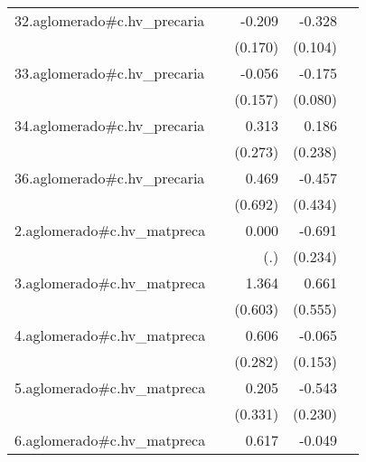 {\begin{longtable}{l*{4}{D{.}{.}{-1}}}
\addlinespace
32.aglomerado#c.hv\_precaria&                     &      -0.209         &      -0.328\sym{**} &                     \\
            &                     &     (0.170)         &     (0.104)         &                     \\
\addlinespace
33.aglomerado#c.hv\_precaria&                     &      -0.056         &      -0.175\sym{*}  &                     \\
            &                     &     (0.157)         &     (0.080)         &                     \\
\addlinespace
34.aglomerado#c.hv\_precaria&                     &       0.313         &       0.186         &                     \\
            &                     &     (0.273)         &     (0.238)         &                     \\
\addlinespace
36.aglomerado#c.hv\_precaria&                     &       0.469         &      -0.457         &                     \\
            &                     &     (0.692)         &     (0.434)         &                     \\
\addlinespace
2.aglomerado#c.hv\_matpreca&                     &       0.000         &      -0.691\sym{**} &                     \\
            &                     &         (.)         &     (0.234)         &                     \\
\addlinespace
3.aglomerado#c.hv\_matpreca&                     &       1.364\sym{*}  &       0.661         &                     \\
            &                     &     (0.603)         &     (0.555)         &                     \\
\addlinespace
4.aglomerado#c.hv\_matpreca&                     &       0.606\sym{*}  &      -0.065         &                     \\
            &                     &     (0.282)         &     (0.153)         &                     \\
\addlinespace
5.aglomerado#c.hv\_matpreca&                     &       0.205         &      -0.543\sym{*}  &                     \\
            &                     &     (0.331)         &     (0.230)         &                     \\
\addlinespace
6.aglomerado#c.hv\_matpreca&                     &       0.617\sym{*}  &      -0.049         &                     \\

\end{longtable}}
